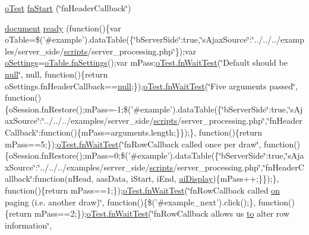 \begin{DoxyCompactItemize}
\item 
\hyperlink{unit__test_8js_a3b2d259e2df3b6860d9047a92d09d0d6}{o\+Test} \hyperlink{4__server-side_2fn_header_callback_8js_a7790307e5422845278cb70540edb3743}{fn\+Start} (\char`\"{}fn\+Header\+Callback\char`\"{})
\item 
\hyperlink{outside_events_8js_aa14f8e0338cced6720590fd2ea13bd4b}{document} \hyperlink{4__server-side_2fn_header_callback_8js_a1294159ae0f730814cea07d5abdab393}{ready} (function()\{var o\+Table=\$('\#example').data\+Table(\{\char`\"{}b\+Server\+Side\char`\"{}\+:true,\char`\"{}s\+Ajax\+Source\char`\"{}\+:\char`\"{}../../../examples/server\+\_\+side/\hyperlink{tinymce_8jquery_8dev_8js_a09066d4d580eeec222f858d588b4cdef}{scripts}/server\+\_\+processing.\+php\char`\"{}\});var \hyperlink{model_8settings_8js_a4857b9c813b4dea010668e9555d0aca7}{o\+Settings}=\hyperlink{api_8methods_8js_a78f387fab92a85c2cb7830bc5d8a6141}{o\+Table.\+fn\+Settings}();var m\+Pass;\hyperlink{onhold_24__server-side_2__zero__config_8js_ab25c4d596771c0133cdc45178ce72c3d}{o\+Test.\+fn\+Wait\+Test}(\char`\"{}Default should be \hyperlink{validate_8js_afb8e110345c45e74478894341ab6b28e}{null}\char`\"{}, null, function()\{return o\+Settings.\+fn\+Header\+Callback==\hyperlink{validate_8js_afb8e110345c45e74478894341ab6b28e}{null};\});\hyperlink{onhold_24__server-side_2__zero__config_8js_ab25c4d596771c0133cdc45178ce72c3d}{o\+Test.\+fn\+Wait\+Test}(\char`\"{}Five arguments passed\char`\"{}, function()\{o\+Session.\+fn\+Restore();m\+Pass=-\/1;\$('\#example').data\+Table(\{\char`\"{}b\+Server\+Side\char`\"{}\+:true,\char`\"{}s\+Ajax\+Source\char`\"{}\+:\char`\"{}../../../examples/server\+\_\+side/\hyperlink{tinymce_8jquery_8dev_8js_a09066d4d580eeec222f858d588b4cdef}{scripts}/server\+\_\+processing.\+php\char`\"{},\char`\"{}fn\+Header\+Callback\char`\"{}\+:function()\{m\+Pass=arguments.\+length;\}\});\}, function()\{return m\+Pass==5;\});\hyperlink{onhold_24__server-side_2__zero__config_8js_ab25c4d596771c0133cdc45178ce72c3d}{o\+Test.\+fn\+Wait\+Test}(\char`\"{}fn\+Row\+Callback called once per draw\char`\"{}, function()\{o\+Session.\+fn\+Restore();m\+Pass=0;\$('\#example').data\+Table(\{\char`\"{}b\+Server\+Side\char`\"{}\+:true,\char`\"{}s\+Ajax\+Source\char`\"{}\+:\char`\"{}../../../examples/server\+\_\+side/\hyperlink{tinymce_8jquery_8dev_8js_a09066d4d580eeec222f858d588b4cdef}{scripts}/server\+\_\+processing.\+php\char`\"{},\char`\"{}fn\+Header\+Callback\char`\"{}\+:function(n\+Head, aas\+Data, i\+Start, i\+End, \hyperlink{core_8constructor_8js_ab6500ff83985151859ca3105a6eb888c}{ai\+Display})\{m\+Pass++;\}\});\}, function()\{return m\+Pass==1;\});\hyperlink{onhold_24__server-side_2__zero__config_8js_ab25c4d596771c0133cdc45178ce72c3d}{o\+Test.\+fn\+Wait\+Test}(\char`\"{}fn\+Row\+Callback called \hyperlink{fullpage_2plugin_8min_8js_a1cfa98b7fed2aaf9fee3b68dbb7f9497}{on} paging (i.\+e. another draw)\char`\"{}, function()\{\$('\#example\+\_\+next').click();\}, function()\{return m\+Pass==2;\});\hyperlink{onhold_24__server-side_2__zero__config_8js_ab25c4d596771c0133cdc45178ce72c3d}{o\+Test.\+fn\+Wait\+Test}(\char`\"{}fn\+Row\+Callback allows us \hyperlink{jquery-ui_8js_af6086621f45baa2cf538f19e45d3c263}{to} alter row information\char`\"{}, 
\end{DoxyCompactItemize}
